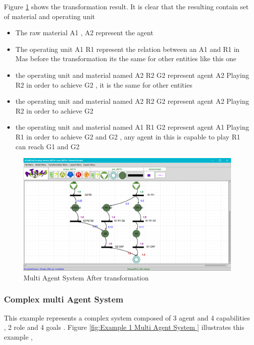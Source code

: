 Figure \ref{fig:Multi Agent System After transformation } shows the transformation result.
It is clear that the resulting contain set of material and operating unit
 
\begin{itemize}
\item The raw material A1 , A2 represent the agent  
\item The operating unit A1 R1 represent the relation between an A1 and R1 
in Mas before the transformation its the same for other entities like this one
\item the operating unit and material named A2 R2 G2 represent agent A2 Playing R2 in order to achieve G2 , it is the same for other entities  

\item the operating unit and material named A2 R2 G2 represent agent A2 Playing R2 in order to achieve G2 


\item the operating unit and material named A1 R1 G2 represent agent A1 Playing R1 in order to achieve G2  and G2 , any agent in this is capable to play R1 can reach G1 and G2
 

\end{itemize}
  


\begin{figure}[th]
	\centering
 	\includegraphics[scale=0.3]{Chapiter3/img/ex1pns}
	\caption{\label{fig:Multi Agent System After transformation }Multi Agent System After transformation}
\end{figure}  
\pagebreak
\subsubsection{ Complex multi Agent System }
This example represents a complex system composed of  3 agent and 4 capabilities , 2 role and 4 goals  . Figure \ref{fig:Example 1 Multi Agent System } illustrates this example ,
 


